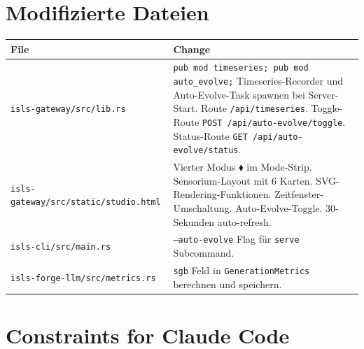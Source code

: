 \documentclass[11pt,a4paper]{article}
\begin{document}
\section{Modifizierte Dateien}

\begin{longtable}{lp{10cm}}
\toprule
\textbf{File} & \textbf{Change} \\
\midrule
\texttt{isls-gateway/src/lib.rs}
  & \texttt{pub mod timeseries; pub mod auto\_evolve;} 
    Timeseries-Recorder und Auto-Evolve-Task spawnen 
    bei Server-Start. Route \texttt{/api/timeseries}. 
    Toggle-Route \texttt{POST /api/auto-evolve/toggle}. 
    Status-Route \texttt{GET /api/auto-evolve/status}. \\
\texttt{isls-gateway/src/static/studio.html}
  & Vierter Modus $\blacklozenge$ im Mode-Strip. 
    Sensorium-Layout mit 6 Karten. SVG-Rendering-Funktionen. 
    Zeitfenster-Umschaltung. Auto-Evolve-Toggle. 
    30-Sekunden auto-refresh. \\
\texttt{isls-cli/src/main.rs}
  & \texttt{--auto-evolve} Flag f\"ur \texttt{serve} 
    Subcommand. \\
\texttt{isls-forge-llm/src/metrics.rs}
  & \texttt{sgb} Feld in \texttt{GenerationMetrics} 
    berechnen und speichern. \\
\bottomrule
\end{longtable}


\section{Constraints for Claude Code}
\end{document}
